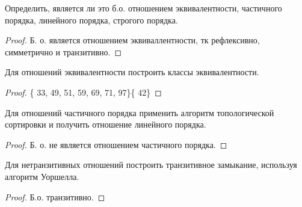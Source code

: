 \begin{problem}
	Определить, является ли это б.о. отношением эквивалентности, частичного порядка, линейного порядка, строгого порядка.
\end{problem}

\begin{proof}
	Б. о. является отношением эквиваллентности, тк рефлексивно, симметрично и транзитивно.
\end{proof}
\begin{problem}
	Для отношений эквивалентности построить классы эквивалентности.
\end{problem}

\begin{proof}
\{ 33, 49, 51, 59, 69, 71, 97\}\{ 42\}
\end{proof}
\begin{problem}
	Для отношений частичного порядка применить алгоритм топологической сортировки и получить отношение линейного порядка.
\end{problem}

\begin{proof}
    Б. о. не является отношением частичного порядка.
\end{proof}
\begin{problem}
	Для нетранзитивных отношений построить транзитивное замыкание, используя алгоритм Уоршелла.
\end{problem}

\begin{proof}
Б.о. транзитивно.
\end{proof}
